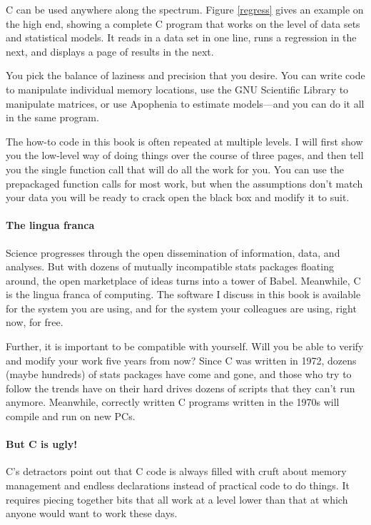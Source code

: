 
C can be used anywhere along the spectrum. Figure \ref{regress} gives
an example on the high end, showing a complete C program that works on
the level of data sets and statistical models. It reads in a data set in
one line, runs a regression in the next, and displays a page of
results in the next.

You pick the balance of laziness and precision that you desire. You
can write code to manipulate individual memory locations, use the GNU Scientific
Library to manipulate matrices, or use Apophenia to estimate models---and
you can do it all in the same program.

The how-to code in this book is often repeated at multiple levels. I
will first show you the low-level way of doing things over the course
of three pages, and then tell you the single function call that will do
all the work for you. You can use the prepackaged function calls for
most work, but when the assumptions don't match your data you will be
ready to crack open the black box and modify it to suit.

\paragraph{The lingua franca}
Science progresses through the open dissemination of information, data,
and analyses. But with dozens of mutually incompatible stats packages
floating around, the open marketplace of ideas turns into a tower of Babel.
Meanwhile, C is the lingua franca of computing. The software I discuss
in this book is available for the system you are using, and for the
system your colleagues are using, right now, for free.

Further, it is important to be compatible with yourself. Will you be able
to verify and modify your work five years from now? Since C was written
in 1972, dozens (maybe hundreds) of stats packages have come and gone,
and those who try to follow the trends have on their hard drives dozens
of scripts that they can't run anymore.  Meanwhile, correctly written
C programs written in the 1970s will compile and run on new PCs.

\paragraph{But C is ugly!} C's detractors point out that C code is
always filled with cruft about memory management and endless declarations
instead of practical code to do things. It requires piecing together bits
that all work at a level lower than that at which anyone would want to
work these days.

